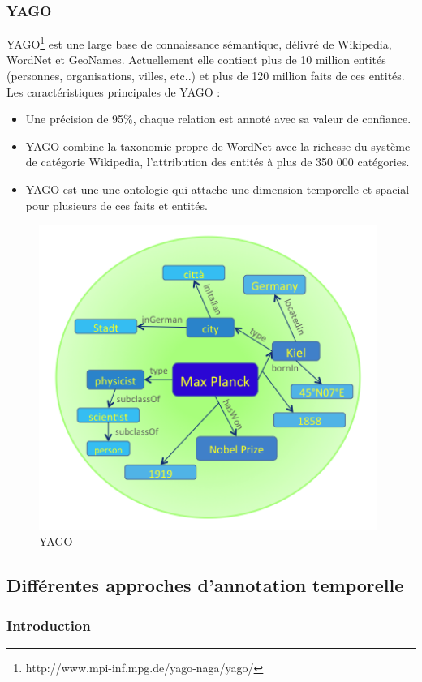 \documentclass[12pt,a4	]{report}
\begin{document}
\subsubsection*{YAGO}
YAGO\footnote{http://www.mpi-inf.mpg.de/yago-naga/yago/} est une large base de connaissance sémantique, délivré de Wikipedia, WordNet et GeoNames. Actuellement elle contient plus de 10 million entités (personnes, organisations, villes, etc..) et plus de 120 million faits de ces entités.
\newline
Les caractéristiques principales de YAGO :
\begin{itemize}
\item Une précision de 95\%, chaque relation est annoté avec sa valeur de confiance.
\item YAGO combine la taxonomie propre de WordNet avec la richesse du système de catégorie Wikipedia, l'attribution des entités à plus de 350 000 catégories.
\item YAGO est une une ontologie qui attache une dimension temporelle et spacial pour plusieurs de ces faits et entités.
\end{itemize}
\begin{figure}[H]
        \centering
                \centering
                \includegraphics[width=11cm]{yago.png}
               \caption{YAGO}

\end{figure}
\subsection*{Différentes approches d'annotation temporelle}			
\subsubsection{Introduction}
\end{document}

